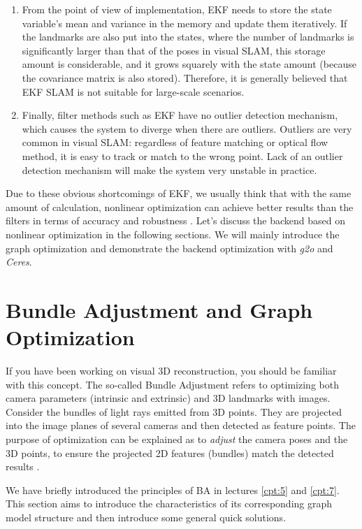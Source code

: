\begin{enumerate}
	\item 
	From the point of view of implementation, EKF needs to store the state variable's mean and variance in the memory and update them iteratively. If the landmarks are also put into the states, where the number of landmarks is significantly larger than that of the poses in visual SLAM, this storage amount is considerable, and it grows squarely with the state amount (because the covariance matrix is also ​​stored). Therefore, it is generally believed that EKF SLAM is not suitable for large-scale scenarios.
	
	\item 
	Finally, filter methods such as EKF have no outlier detection mechanism, which causes the system to diverge when there are outliers. Outliers are very common in visual SLAM: regardless of feature matching or optical flow method, it is easy to track or match to the wrong point. Lack of an outlier detection mechanism will make the system very unstable in practice.
\end{enumerate}

Due to these obvious shortcomings of EKF, we usually think that with the same amount of calculation, nonlinear optimization can achieve better results than the filters in terms of accuracy and robustness  {\cite{Strasdat2012}}. Let's discuss the backend based on nonlinear optimization in the following sections. We will mainly introduce the graph optimization and demonstrate the backend optimization with \textit{g2o} and \textit{Ceres}.

\section{Bundle Adjustment and Graph Optimization}
If you have been working on visual 3D reconstruction, you should be familiar with this concept. The so-called Bundle Adjustment refers to optimizing both camera parameters (intrinsic and extrinsic) and 3D landmarks with images. Consider the bundles of light rays emitted from 3D points. They are projected into the image planes of several cameras and then detected as feature points. The purpose of optimization can be explained as to \textit{adjust} the camera poses and the 3D points, to ensure the projected 2D features (bundles) match the detected results {\cite{Triggs2000}}.

We have briefly introduced the principles of BA in lectures \ref{cpt:5} and \ref{cpt:7}. This section aims to introduce the characteristics of its corresponding graph model structure and then introduce some general quick solutions.


